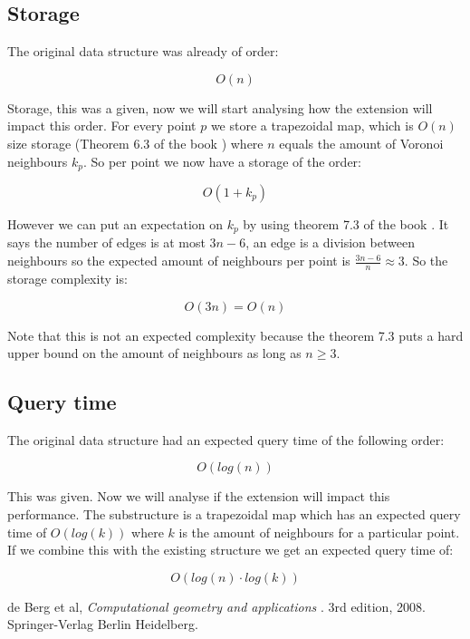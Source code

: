 \documentclass{article}
\begin{document}
\subsection{Storage}
The original data structure was already of order:

\[O(n)\]

Storage, this was a given, now we will start analysing how the extension
will impact this order.
For every point $p$ we store a trapezoidal map, which is $O(n)$ size
storage (Theorem 6.3 of the book \cite{book}) where $n$ equals the amount of
Voronoi neighbours $k_p$. So per point we now have a storage of the order:

\[O(1+k_p)\]

However we can put an expectation on $k_p$ by using theorem 7.3 of the book
\cite{book}. It says the number of edges is at most $3n-6$, an edge is a
division between neighbours so the expected amount of neighbours per point
is $\frac{3n-6}{n} \approx 3$. So the storage complexity is:

\[ O(3n) = O(n) \]

Note that this is not an expected complexity because the theorem 7.3 puts
a hard upper bound on the amount of neighbours as long as $n\geq3$.
\subsection{Query time}
The original data structure had an expected query time of the following order:

\[O(log(n))\]

This was given. Now we will analyse if the extension will impact this
performance. The substructure is a trapezoidal map which has an expected
query time of $O(log(k))$ where $k$ is the amount of neighbours for a
particular point. If we combine this with the existing structure
we get an expected query time of:

\[O(log(n) \cdot log(k)) \]

\begin{thebibliography}{9}
de Berg et al,
\textit{Computational geometry and applications }.
3rd edition, 2008. Springer-Verlag Berlin Heidelberg.
\end{thebibliography}
\end{document}
